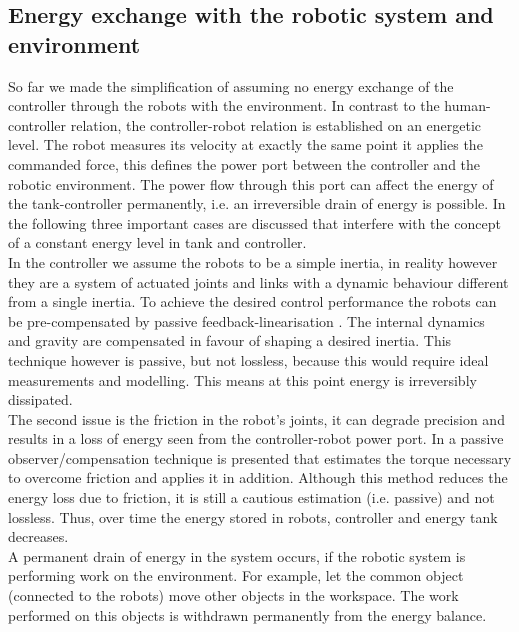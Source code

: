 \documentclass[a4paper,twoside, openright,12pt]{report}
\begin{document}
{\subsection{Energy exchange with the robotic system and environment}\label{SS:EnergyExchangeEnvironment}
So far we made the simplification of assuming no energy exchange of the controller through the robots with the environment. In contrast to the human-controller relation, the controller-robot relation is established on an energetic level. The robot measures its velocity at exactly the same point it applies the commanded force, this defines the power port between the controller and the robotic environment. The power flow through this port can affect the energy of the tank-controller permanently, i.e. an irreversible drain of  energy is possible. In the following three important cases are discussed that interfere with the concept of a constant energy level in tank and controller.\\ 
In the controller we assume the robots to be a simple inertia, in reality however they are a system of actuated joints and links with a dynamic behaviour different from a  single inertia. To achieve the desired control performance the robots can be pre-compensated by  passive feedback-linearisation \cite{Ott_04}. The internal dynamics and gravity are compensated in favour of shaping a desired inertia. This technique however is passive, but not lossless, because this would require ideal measurements and modelling. This means at this point energy is irreversibly dissipated. \\
The second issue is the friction in the robot's joints, it can degrade precision and results in a loss of energy seen from the controller-robot power port. In \cite{Tien_08} a passive observer/compensation technique is presented that estimates the torque necessary to overcome friction and applies it in addition. Although this method reduces the energy loss due to friction, it is still a cautious estimation (i.e. passive) and not lossless. Thus, over time the energy stored in robots, controller and energy tank decreases. \\
A permanent drain of energy in the system occurs, if the robotic system is performing work on the environment. For example, let the common object (connected to the robots) move other objects in the workspace. The work performed on this objects is withdrawn permanently from the energy balance.\\
}
\end{document}
